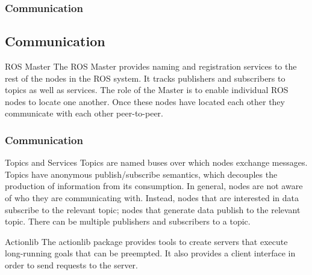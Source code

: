 \documentclass{beamer}
\begin{document}



	\begin{frame}
	\frametitle{Communication}
	\subsection{Communication}
	\begin{block}{ROS Master} 
	    The ROS Master provides naming and registration services to the rest of the nodes in the ROS system. It tracks publishers and subscribers to topics as well as services. The role of the Master is to enable individual ROS nodes to locate one another. Once these nodes have located each other they communicate with each other peer-to-peer.\cite{Master:2019}
	\end{block}
	\end{frame}


	\begin{frame}
	\frametitle{Communication}
	    \begin{block}{Topics and Services} 
	        Topics are named buses over which nodes exchange messages. Topics have anonymous publish/subscribe semantics, which decouples the production of information from its consumption. In general, nodes are not aware of who they are communicating with. Instead, nodes that are interested in data subscribe to the relevant topic; nodes that generate data publish to the relevant topic. There can be multiple publishers and subscribers to a topic.\cite{Topics:2019}
	    \end{block}

	    \begin{block}{Actionlib}
	        The actionlib package provides tools to create servers that execute long-running goals that can be preempted. It also provides a client interface in order to send requests to the server.\cite{Actionlib:2019}
	    \end{block}
	\end{frame}


	
	
\end{document}
